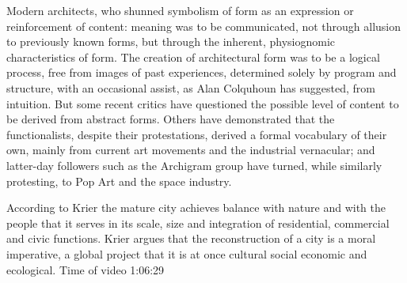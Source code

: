      Modern architects, who shunned symbolism of form  as  an expression or reinforcement of content: meaning was  to  be  communicated,  not  through  allusion  to  previously  known forms, but through the inherent, physiognomic characteristics of form.
    The creation of architectural form was to be a logical process, free  from images  of past experiences, determined solely by program and structure, with an  occasional  assist,  as  Alan Colquhoun has  suggested, from  intuition.
    But some recent critics  have  questioned  the possible level of content to  be derived  from  abstract forms.
    Others have  demonstrated that the functionalists,  despite  their protestations, derived  a  formal vocabulary of their own, mainly from current art movements and the industrial vernacular;
    and  latter-day  followers  such  as  the  Archigram  group  have turned,  while  similarly  protesting,  to Pop  Art and  the space  industry.\cite{Venturi1972}

    According to Krier the mature city achieves balance with nature and with the people that it serves in its scale, size and integration of residential, commercial and civic functions.
    Krier argues that the reconstruction of a city is a moral imperative, a global project that it is at once cultural social economic and ecological. Time of video 1:06:29\cite{Economakis2023}